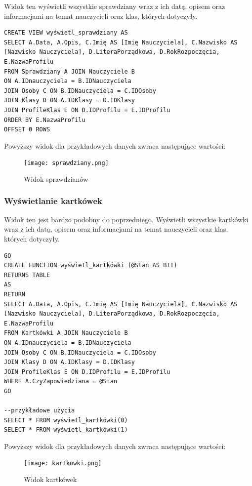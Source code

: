 \documentclass[60pt]{article}
\begin{document}
Widok ten wyświetli wszystkie sprawdziany wraz z ich datą, opisem oraz informacjami na temat nauczycieli oraz klas, których dotyczyły.

\begin{verbatim}
CREATE VIEW wyświetl_sprawdziany AS
SELECT A.Data, A.Opis, C.Imię AS [Imię Nauczyciela], C.Nazwisko AS [Nazwisko Nauczyciela], D.LiteraPorządkowa, D.RokRozpoczęcia, E.NazwaProfilu
FROM Sprawdziany A JOIN Nauczyciele B
ON A.IDnauczyciela = B.IDNauczyciela
JOIN Osoby C ON B.IDNauczyciela = C.IDOsoby
JOIN Klasy D ON A.IDKlasy = D.IDKlasy
JOIN ProfileKlas E ON D.IDProfilu = E.IDProfilu
ORDER BY E.NazwaProfilu
OFFSET 0 ROWS
\end{verbatim}

Powyższy widok dla przykładowych danych zwraca następujące wartości:

\begin{figure}[h]
  \texttt{[image: sprawdziany.png]}
  \caption{Widok sprawdzianów}
  \label{Widok sprawdzianów}
\end{figure}

\subsubsection{Wyświetlanie kartkówek}

Widok ten jest bardzo podobny do poprzedniego. Wyświetli wszystkie kartkówki wraz z ich datą, opisem oraz informacjami na temat nauczycieli oraz klas, których dotyczyły.

\begin{verbatim}
GO
CREATE FUNCTION wyświetl_kartkówki (@Stan AS BIT)
RETURNS TABLE
AS
RETURN
SELECT A.Data, A.Opis, C.Imię AS [Imię Nauczyciela], C.Nazwisko AS [Nazwisko Nauczyciela], D.LiteraPorządkowa, D.RokRozpoczęcia, E.NazwaProfilu
FROM Kartkówki A JOIN Nauczyciele B
ON A.IDnauczyciela = B.IDNauczyciela
JOIN Osoby C ON B.IDNauczyciela = C.IDOsoby
JOIN Klasy D ON A.IDKlasy = D.IDKlasy
JOIN ProfileKlas E ON D.IDProfilu = E.IDProfilu
WHERE A.CzyZapowiedziana = @Stan
GO

--przykładowe użycia
SELECT * FROM wyświetl_kartkówki(0)
SELECT * FROM wyświetl_kartkówki(1)
\end{verbatim}

Powyższy widok dla przykładowych danych zwraca następujące wartości:

\begin{figure}[h]
  \texttt{[image: kartkowki.png]}
  \caption{Widok kartkówek}
  \label{Widok kartkówek}
\end{figure}
\end{document}
